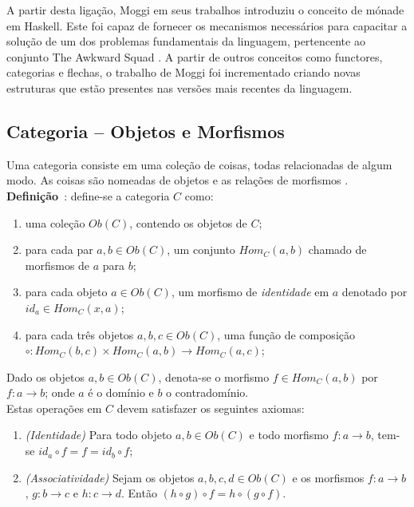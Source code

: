 \documentclass[10pt, conference]{IEEEtran}
\begin{document}
A partir desta ligação, Moggi em seus trabalhos \cite{moggi1989lambdaandmonads, mogi1991notionsofcompandmonad} introduziu o conceito de mónade em Haskell. Este foi capaz de fornecer os mecanismos necessários para capacitar a solução de um dos problemas fundamentais da linguagem,  pertencente ao conjunto The Awkward Squad \cite{jones2001tacklingthe}. A partir de outros conceitos como functores, categorias e flechas, o trabalho de Moggi foi incrementado criando novas estruturas que estão presentes nas versões mais recentes da linguagem.

\subsection{Categoria -- Objetos e Morfismos}
\label{subsec:sub-cat}
Uma categoria consiste em uma coleção de coisas, todas relacionadas de algum modo. As coisas são nomeadas de objetos e as relações de morfismos \cite{spivak2014cts}.\\

\textbf{Definição}~\cite{spivak2014cts, maclane1971mat}: define-se a categoria $C$ como:

\begin{enumerate}[label=(\alph*), leftmargin=3em, topsep = 0pt, itemsep = 1ex, partopsep = 1ex, parsep = 1ex]
	\item uma coleção ${Ob(C)}$, contendo os objetos de $C$;
	\item para cada par ${a, b \in Ob(C)}$, um conjunto ${Hom_C(a, b)}$ chamado de morfismos de $a$ para $b$;
	\item para cada objeto ${a \in Ob(C)}$, um morfismo de \textit{identidade} em $a$ denotado por ${id_a \in Hom_C(x, a)}$;
	\item para cada três objetos ${a, b, c \in Ob(C)}$, uma função de composição $\circ: Hom_C(b, c) \times Hom_C(a, b) \rightarrow Hom_C(a, c)$;
\end{enumerate}

Dado os objetos $a, b \in Ob(C)$, denota-se o morfismo $f \in Hom_C(a, b)$ por $f: a \rightarrow b$; onde $a$ é o domínio e $b$ o contradomínio.\\

Estas operações em $C$ devem satisfazer os seguintes axiomas:

\begin{enumerate}[label={}, leftmargin = 2em, topsep = 0pt, itemsep = 1ex,partopsep = 1ex, parsep = 1ex]
	\item \textit{(Identidade)} Para todo objeto $a, b \in Ob(C)$ e todo morfismo $f: a \rightarrow b$, tem-se $id_a \circ f = f = id_b \circ f$;
	\item \textit{(Associatividade)} Sejam os objetos $a, b, c, d \in Ob(C)$ e os morfismos $f: a \rightarrow b$, $g: b \rightarrow c$ e $h: c \rightarrow d$. Então $(h \circ g) \circ f = h \circ (g \circ f)$.
\end{enumerate}
\end{document}
